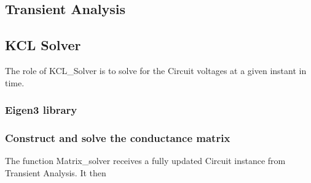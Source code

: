\documentclass{article}
\begin{document}
\subsection{Transient Analysis}
\subsection{KCL Solver}
The role of KCL\_Solver is to solve for the Circuit voltages at a given instant in time.\\
\subsubsection{Eigen3 library}
\subsubsection{Construct and solve the conductance matrix}
The function Matrix\_solver receives a fully updated Circuit instance from
Transient Analysis. It then
\newpage
\end{document}
